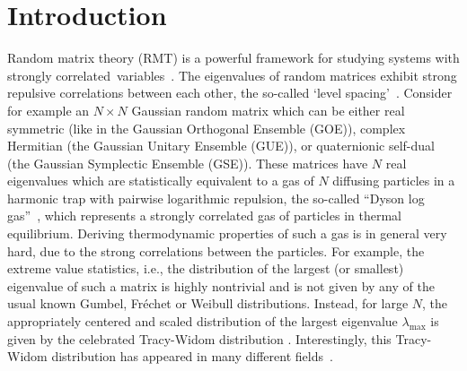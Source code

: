 \documentclass[onecolumn,superscriptaddress,
 amsmath,amssymb,
 aps,
 prd,
]{revtex4-1}
\begin{document}
\maketitle

\section{Introduction} \label{sec:intro}

Random matrix theory (RMT) is a powerful framework for studying systems with strongly correlated~variables~\cite{W28,W51,M91,F10,LNV18,PB20,MPS20,MSbook}.
%
%
The eigenvalues of random matrices exhibit strong repulsive correlations between each other, the so-called `level spacing'~\cite{W51,M91,F10}. Consider for example an $N \times N$ Gaussian random matrix which can be either real symmetric (like in the Gaussian Orthogonal Ensemble (GOE)), complex Hermitian (the Gaussian Unitary Ensemble (GUE)), or quaternionic self-dual (the Gaussian Symplectic Ensemble (GSE)). These matrices have $N$ real eigenvalues  
which  are statistically equivalent to a gas of $N$ diffusing particles in a harmonic trap with pairwise logarithmic repulsion, the so-called ``Dyson log gas''~\cite{D62,D62b}, which represents a strongly correlated gas of particles in thermal equilibrium. Deriving thermodynamic properties of such a gas is in general very hard, due to the strong correlations between the particles. For example, the extreme value statistics, i.e., the distribution of the largest (or smallest) eigenvalue of such a matrix is highly nontrivial and is not given by any of the usual known Gumbel, Fr\'echet or Weibull distributions. Instead,  
for large $N$, the appropriately centered and scaled distribution of the largest eigenvalue $\lambda_{\max}$ is given by the celebrated Tracy-Widom distribution \cite{TW94,TW96}. Interestingly, this Tracy-Widom distribution has appeared in many different fields~\cite{MS14}. 
\end{document}
